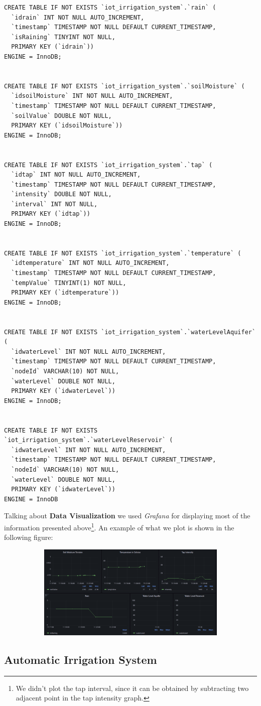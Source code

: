 \begin{verbatim}
CREATE TABLE IF NOT EXISTS `iot_irrigation_system`.`rain` (
  `idrain` INT NOT NULL AUTO_INCREMENT,
  `timestamp` TIMESTAMP NOT NULL DEFAULT CURRENT_TIMESTAMP,
  `isRaining` TINYINT NOT NULL,
  PRIMARY KEY (`idrain`))
ENGINE = InnoDB;


CREATE TABLE IF NOT EXISTS `iot_irrigation_system`.`soilMoisture` (
  `idsoilMoisture` INT NOT NULL AUTO_INCREMENT,
  `timestamp` TIMESTAMP NOT NULL DEFAULT CURRENT_TIMESTAMP,
  `soilValue` DOUBLE NOT NULL,
  PRIMARY KEY (`idsoilMoisture`))
ENGINE = InnoDB;


CREATE TABLE IF NOT EXISTS `iot_irrigation_system`.`tap` (
  `idtap` INT NOT NULL AUTO_INCREMENT,
  `timestamp` TIMESTAMP NOT NULL DEFAULT CURRENT_TIMESTAMP,
  `intensity` DOUBLE NOT NULL,
  `interval` INT NOT NULL,
  PRIMARY KEY (`idtap`))
ENGINE = InnoDB;


CREATE TABLE IF NOT EXISTS `iot_irrigation_system`.`temperature` (
  `idtemperature` INT NOT NULL AUTO_INCREMENT,
  `timestamp` TIMESTAMP NOT NULL DEFAULT CURRENT_TIMESTAMP,
  `tempValue` TINYINT(1) NOT NULL,
  PRIMARY KEY (`idtemperature`))
ENGINE = InnoDB;


CREATE TABLE IF NOT EXISTS `iot_irrigation_system`.`waterLevelAquifer` (
  `idwaterLevel` INT NOT NULL AUTO_INCREMENT,
  `timestamp` TIMESTAMP NOT NULL DEFAULT CURRENT_TIMESTAMP,
  `nodeId` VARCHAR(10) NOT NULL,
  `waterLevel` DOUBLE NOT NULL,
  PRIMARY KEY (`idwaterLevel`))
ENGINE = InnoDB;


CREATE TABLE IF NOT EXISTS `iot_irrigation_system`.`waterLevelReservoir` (
  `idwaterLevel` INT NOT NULL AUTO_INCREMENT,
  `timestamp` TIMESTAMP NOT NULL DEFAULT CURRENT_TIMESTAMP,
  `nodeId` VARCHAR(10) NOT NULL,
  `waterLevel` DOUBLE NOT NULL,
  PRIMARY KEY (`idwaterLevel`))
ENGINE = InnoDB
\end{verbatim}


Talking about \textbf{Data Visualization} we used \textit{Grafana} for displaying most of the information presented above\footnote{We didn't plot the tap interval, since it can be obtained by subtracting two adjacent point in the tap intensity graph.}. An example of what we plot is shown in the following figure:

\begin{figure}[H]
	\begin{subfigure}{\textwidth}
	\centering
		\includegraphics[width=1\linewidth]{img/grafana.png} 
	\end{subfigure}
\end{figure}

\subsection{Automatic Irrigation System}
